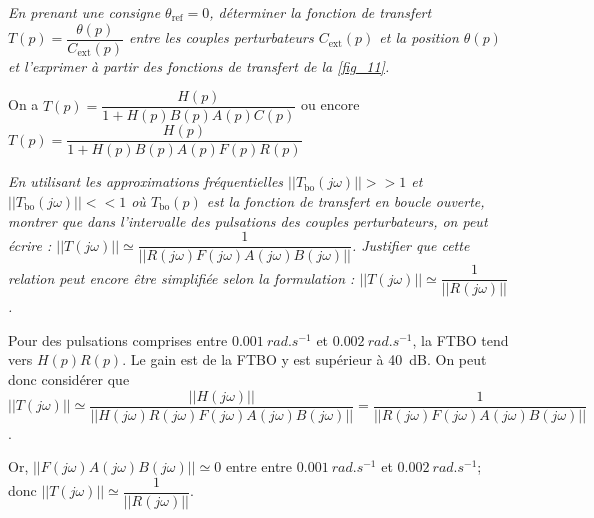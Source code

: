 \question{\label{q_18}}\textit{En prenant une consigne $\theta_{\text{ref}} = 0$, déterminer la fonction de transfert $T(p) = \dfrac{\theta(p)}{C_{\text{ext}}(p)}$ entre les couples perturbateurs $C_{\text{ext}}(p)$ et la position $\theta(p)$ et l’exprimer à partir des fonctions de transfert de la \autoref{fig_11}.}
\ifprof
\begin{corrige}
On a $T(p)=\dfrac{H(p)}{1+H(p)B(p)A(p)C(p)}$ ou encore $T(p)=\dfrac{H(p)}{1+H(p)B(p)A(p)F(p)R(p)}$
\end{corrige}
\else
\fi

\question{\label{q_19}}\textit{En utilisant les approximations fréquentielles 
$||T_{\text{bo}}(j\omega)||>>1$ et
$||T_{\text{bo}}(j\omega)||<<1$
où $T_{\text{bo}}(p)$ est la fonction
de transfert en boucle ouverte, montrer que dans l’intervalle des pulsations des couples perturbateurs, 
on peut écrire : 
$||T(j\omega)||\simeq \dfrac{1}{|| R\left(j\omega\right) F\left(j\omega\right) A\left(j\omega\right) B\left(j\omega\right)|| }$. 
 Justifier que cette relation peut encore être simplifiée selon la formulation :
 $||T(j\omega)||\simeq \dfrac{1}{|| R\left(j\omega\right)||}$.}

\ifprof
\begin{corrige}
Pour des pulsations comprises entre $\SI{0,001}{rad.s^{-1}}$ et $\SI{0,002}{rad.s^{-1}}$, la FTBO tend vers $H(p)R(p)$.
Le gain est de la FTBO y est supérieur à \SI{40}{dB}. On peut donc considérer que 
$||T(j\omega)||\simeq \dfrac{||H\left(j\omega\right)||}{|| H\left(j\omega\right) R\left(j\omega\right) F\left(j\omega\right) A\left(j\omega\right) B\left(j\omega\right)|| } = \dfrac{1}{|| R\left(j\omega\right) F\left(j\omega\right) A\left(j\omega\right) B\left(j\omega\right)|| }$.

Or, $||F\left(j\omega\right) A\left(j\omega\right) B\left(j\omega\right)|| \simeq 0$ entre  entre $\SI{0,001}{rad.s^{-1}}$ et $\SI{0,002}{rad.s^{-1}}$; donc $||T(j\omega)||\simeq \dfrac{1}{|| R\left(j\omega\right)||}$.

\end{corrige}
\else
\fi

